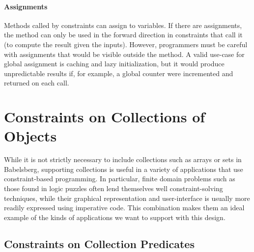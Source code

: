 \paragraph*{Assignments}
Methods called by constraints can assign to variables. If there are
assignments, the method can only be used in the forward direction in
constraints that call it (\ie to compute the result given the
inputs). However, programmers must be careful with assignments that
would be visible outside the method. A valid use-case for global
assignment is caching and lazy initialization, but it would produce
unpredictable results if, for example, a global counter were
incremented and returned on each call.


\section{Constraints on Collections of Objects}
\label{sec:collections}

While it is not strictly necessary to include collections such as
arrays or sets in Babelsberg, supporting collections is useful in a
variety of applications that use constraint-based programming. In
particular, finite domain problems such as those found in logic
puzzles often lend themselves well constraint-solving techniques,
while their graphical representation and user-interface is usually
more readily expressed using imperative code. This combination makes
them an ideal example of the kinds of applications we want to support
with this design.

\subsection{Constraints on Collection Predicates}
\label{sec:constr-coll-pred}

